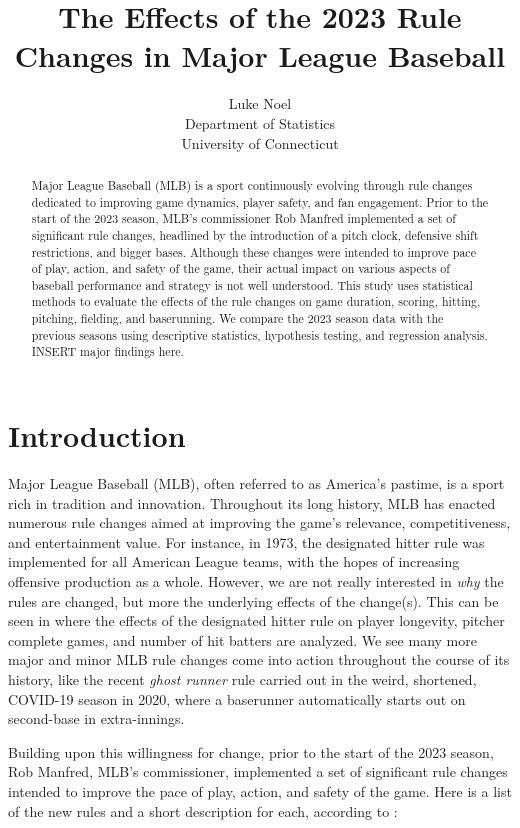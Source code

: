 \documentclass[12pt]{article}
\title{The Effects of the 2023 Rule Changes in Major League Baseball}
\author{Luke Noel\\
  Department of Statistics\\
  University of Connecticut
}
\begin{document}
\maketitle

\begin{abstract}
Major League Baseball (MLB) is a sport continuously evolving through rule
changes dedicated to improving game dynamics, player safety, and fan engagement.
Prior to the start of the 2023 season, MLB's commissioner Rob Manfred
implemented a set of significant rule changes, headlined by the introduction of 
a pitch clock, defensive shift restrictions, and bigger bases. Although these
changes were intended to improve pace of play, action, and safety of the game,
their actual impact on various aspects of baseball performance and strategy is 
not well understood. This study uses statistical methods to evaluate the effects
of the rule changes on game duration, scoring, hitting, pitching, fielding, and
baserunning. We compare the 2023 season data with the previous seasons using
descriptive statistics, hypothesis testing, and regression analysis. INSERT
major findings here.
\end{abstract}


\section{Introduction}
\label{sec:intro}

Major League Baseball (MLB), often referred to as America's pastime, is a sport
rich in tradition and innovation. Throughout its long history, MLB has enacted
numerous rule changes aimed at improving the game's relevance, competitiveness,
and entertainment value. For instance, in 1973, the designated hitter rule was
implemented for all American League teams, with the hopes of increasing
offensive production as a whole. However, we are not really interested in \emph{why}
the rules are changed, but more the underlying effects of the change(s). This
can be seen in \citet{Cooley} where the effects of the designated hitter rule
on player longevity, pitcher complete games, and number of hit batters are
analyzed. We see many more major and minor MLB rule changes come into action
throughout the course of its history, like the recent \emph{ghost runner} rule
carried out in the weird, shortened, COVID-19 season in 2020, where a baserunner 
automatically starts out on second-base in extra-innings.

Building upon this willingness for change, prior to the start of the 2023 season,
Rob Manfred, MLB's commissioner, implemented a set of significant rule changes
intended to improve the pace of play, action, and safety of the game. Here is
a list of the new rules and a short description for each, according to \citet{Castrovince}:
\end{document}
